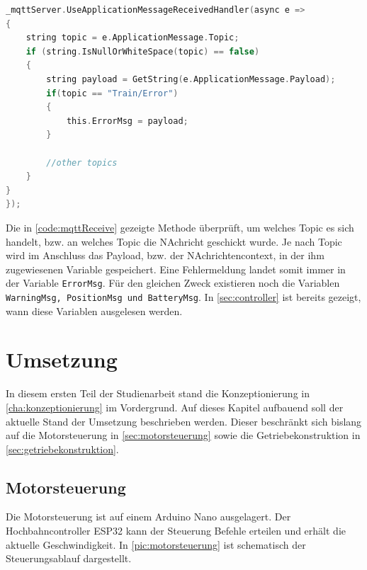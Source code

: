 \begin{lstlisting}[language=c, style=dhpaperdefault]
_mqttServer.UseApplicationMessageReceivedHandler(async e =>
{
	string topic = e.ApplicationMessage.Topic;
	if (string.IsNullOrWhiteSpace(topic) == false)
	{
		string payload = GetString(e.ApplicationMessage.Payload);
		if(topic == "Train/Error")
		{
			this.ErrorMsg = payload;
		}
		
		//other topics
	}
}
});

\end{lstlisting}
\vspace{0.5cm}

Die in \autoref{code:mqttReceive} gezeigte Methode überprüft, um welches Topic es sich handelt, bzw. an welches Topic die NAchricht geschickt wurde. Je nach Topic wird im Anschluss das Payload, bzw. der NAchrichtencontext, in der ihm zugewiesenen Variable gespeichert. Eine Fehlermeldung landet somit immer in der Variable \texttt{ErrorMsg}. Für den gleichen Zweck existieren noch die Variablen \texttt{WarningMsg, PositionMsg und BatteryMsg}. In \autoref{sec:controller} ist bereits gezeigt, wann diese Variablen ausgelesen werden. 

\chapter{Umsetzung} 
\label{cha:umsetzung}
In diesem ersten Teil der Studienarbeit stand die Konzeptionierung in \autoref{cha:konzeptionierung} im Vordergrund. Auf dieses Kapitel aufbauend soll der aktuelle Stand der Umsetzung beschrieben werden. Dieser beschränkt sich bislang auf die Motorsteuerung in \autoref{sec:motorsteuerung} sowie die Getriebekonstruktion in \autoref{sec:getriebekonstruktion}.
\newpage
 
\section{Motorsteuerung}
\label{sec:motorsteuerung}
Die Motorsteuerung ist auf einem Arduino Nano ausgelagert. Der Hochbahncontroller ESP32 kann der Steuerung Befehle erteilen und erhält die aktuelle Geschwindigkeit. In \autoref{pic:motorsteuerung} ist schematisch der Steuerungsablauf  dargestellt. 

